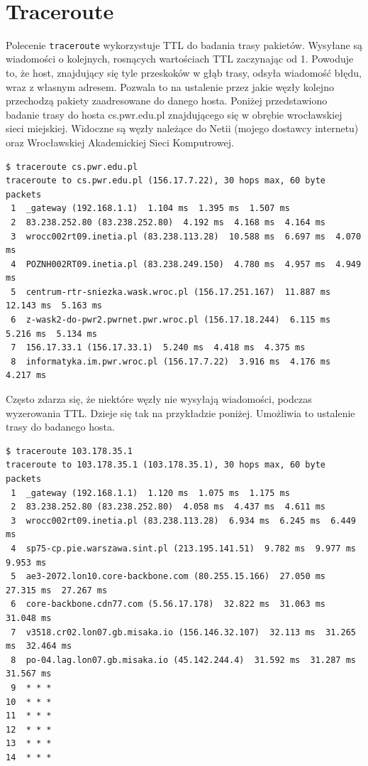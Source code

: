 \documentclass{article}
\begin{document}
    \newpage
 ~
    \newpage
\section{Traceroute}
Polecenie \texttt{traceroute} wykorzystuje TTL do badania trasy pakietów. Wysyłane są wiadomości o kolejnych, rosnących wartościach TTL zaczynając od 1. Powoduje to, że host, znajdujący się tyle przeskoków w głąb trasy, odsyła wiadomość błędu, wraz z własnym adresem. Pozwala to na ustalenie przez jakie węzły kolejno przechodzą pakiety zaadresowane do danego hosta. Poniżej przedstawiono badanie trasy do hosta cs.pwr.edu.pl znajdującego się w obrębie wrocławskiej sieci miejskiej. Widoczne są węzły należące do Netii (mojego dostawcy internetu) oraz Wrocławskiej Akademickiej Sieci Komputrowej.

\begin{lstlisting}
$ traceroute cs.pwr.edu.pl
traceroute to cs.pwr.edu.pl (156.17.7.22), 30 hops max, 60 byte packets
 1  _gateway (192.168.1.1)  1.104 ms  1.395 ms  1.507 ms
 2  83.238.252.80 (83.238.252.80)  4.192 ms  4.168 ms  4.164 ms
 3  wrocc002rt09.inetia.pl (83.238.113.28)  10.588 ms  6.697 ms  4.070 ms
 4  POZNH002RT09.inetia.pl (83.238.249.150)  4.780 ms  4.957 ms  4.949 ms
 5  centrum-rtr-sniezka.wask.wroc.pl (156.17.251.167)  11.887 ms  12.143 ms  5.163 ms
 6  z-wask2-do-pwr2.pwrnet.pwr.wroc.pl (156.17.18.244)  6.115 ms  5.216 ms  5.134 ms
 7  156.17.33.1 (156.17.33.1)  5.240 ms  4.418 ms  4.375 ms
 8  informatyka.im.pwr.wroc.pl (156.17.7.22)  3.916 ms  4.176 ms  4.217 ms
\end{lstlisting}

Często zdarza się, że niektóre węzły nie wysyłają wiadomości, podczas wyzerowania TTL. Dzieje się tak na przykładzie poniżej. Umożliwia to ustalenie trasy do badanego hosta.
\begin{lstlisting}
$ traceroute 103.178.35.1
traceroute to 103.178.35.1 (103.178.35.1), 30 hops max, 60 byte packets
 1  _gateway (192.168.1.1)  1.120 ms  1.075 ms  1.175 ms
 2  83.238.252.80 (83.238.252.80)  4.058 ms  4.437 ms  4.611 ms
 3  wrocc002rt09.inetia.pl (83.238.113.28)  6.934 ms  6.245 ms  6.449 ms
 4  sp75-cp.pie.warszawa.sint.pl (213.195.141.51)  9.782 ms  9.977 ms  9.953 ms
 5  ae3-2072.lon10.core-backbone.com (80.255.15.166)  27.050 ms  27.315 ms  27.267 ms
 6  core-backbone.cdn77.com (5.56.17.178)  32.822 ms  31.063 ms  31.048 ms
 7  v3518.cr02.lon07.gb.misaka.io (156.146.32.107)  32.113 ms  31.265 ms  32.464 ms
 8  po-04.lag.lon07.gb.misaka.io (45.142.244.4)  31.592 ms  31.287 ms  31.567 ms
 9  * * *
10  * * *
11  * * *
12  * * *
13  * * *
14  * * *
\end{lstlisting}
\end{document}
